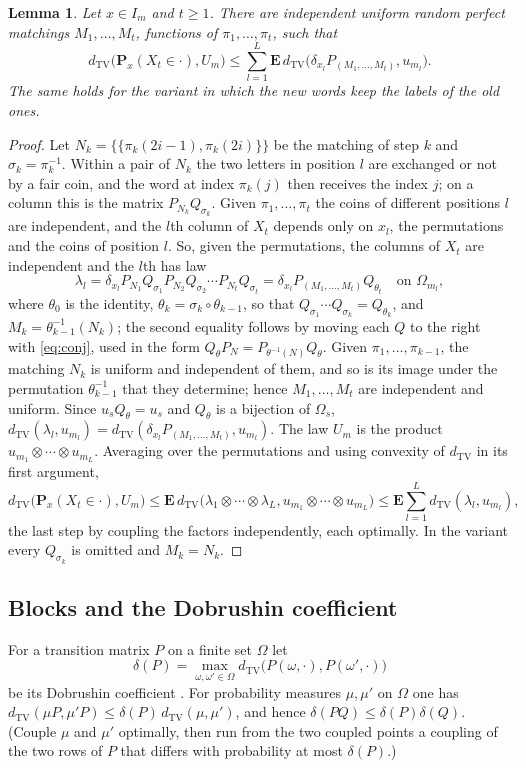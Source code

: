 \documentclass[11pt]{amsart}
\newtheorem{lemma}[theorem]{Lemma}
\theoremstyle{remark}
\numberwithin{equation}{section}
\newcommand{\TV}{d_{\mathrm{TV}}}
\newcommand{\Pm}{\mathbf P}
\newcommand{\E}{\mathbf E}
\begin{document}
\begin{lemma}\label{lem:columns}
Let $x\in I_m$ and $t\ge1$. There are independent uniform random perfect matchings $M_1,\dots,M_t$, functions of $\pi_1,\dots,\pi_t$, such that
\[
\TV\bigl(\Pm_x(X_t\in\cdot),U_m\bigr)\le\sum_{l=1}^L\E\,\TV\bigl(\delta_{x_l}P_{(M_1,\dots,M_t)},u_{m_l}\bigr).
\]
The same holds for the variant in which the new words keep the labels of the old ones.
\end{lemma}

\begin{proof}
Let $N_k=\{\{\pi_k(2i-1),\pi_k(2i)\}\}$ be the matching of step $k$ and $\sigma_k=\pi_k^{-1}$. Within a pair of $N_k$ the two letters in position $l$ are exchanged or not by a fair coin, and the word at index $\pi_k(j)$ then receives the index $j$; on a column this is the matrix $P_{N_k}Q_{\sigma_k}$. Given $\pi_1,\dots,\pi_t$ the coins of different positions $l$ are independent, and the $l$th column of $X_t$ depends only on $x_l$, the permutations and the coins of position $l$. So, given the permutations, the columns of $X_t$ are independent and the $l$th has law
\[
\lambda_l=\delta_{x_l}P_{N_1}Q_{\sigma_1}P_{N_2}Q_{\sigma_2}\cdots P_{N_t}Q_{\sigma_t}=\delta_{x_l}P_{(M_1,\dots,M_t)}Q_{\theta_t}\quad\text{on }\Omega_{m_l},
\]
where $\theta_0$ is the identity, $\theta_k=\sigma_k\circ\theta_{k-1}$, so that $Q_{\sigma_1}\cdots Q_{\sigma_k}=Q_{\theta_k}$, and $M_k=\theta_{k-1}^{-1}(N_k)$; the second equality follows by moving each $Q$ to the right with \eqref{eq:conj}, used in the form $Q_\theta P_N=P_{\theta^{-1}(N)}Q_\theta$. Given $\pi_1,\dots,\pi_{k-1}$, the matching $N_k$ is uniform and independent of them, and so is its image under the permutation $\theta_{k-1}^{-1}$ that they determine; hence $M_1,\dots,M_t$ are independent and uniform. Since $u_sQ_\theta=u_s$ and $Q_\theta$ is a bijection of $\Omega_s$, $\TV(\lambda_l,u_{m_l})=\TV(\delta_{x_l}P_{(M_1,\dots,M_t)},u_{m_l})$. The law $U_m$ is the product $u_{m_1}\otimes\cdots\otimes u_{m_L}$. Averaging over the permutations and using convexity of $\TV$ in its first argument,
\[
\TV\bigl(\Pm_x(X_t\in\cdot),U_m\bigr)\le\E\,\TV\bigl(\lambda_1\otimes\cdots\otimes\lambda_L,u_{m_1}\otimes\cdots\otimes u_{m_L}\bigr)\le\E\sum_{l=1}^L\TV(\lambda_l,u_{m_l}),
\]
the last step by coupling the factors independently, each optimally. In the variant every $Q_{\sigma_k}$ is omitted and $M_k=N_k$.
\end{proof}

\subsection{Blocks and the Dobrushin coefficient}\label{subsec:blocks}
For a transition matrix $P$ on a finite set $\Omega$ let
\[
\delta(P)=\max_{\omega,\omega'\in\Omega}\TV\bigl(P(\omega,\cdot),P(\omega',\cdot)\bigr)
\]
be its Dobrushin coefficient \cite{Do56}. For probability measures $\mu,\mu'$ on $\Omega$ one has $\TV(\mu P,\mu' P)\le\delta(P)\,\TV(\mu,\mu')$, and hence $\delta(PQ)\le\delta(P)\delta(Q)$. (Couple $\mu$ and $\mu'$ optimally, then run from the two coupled points a coupling of the two rows of $P$ that differs with probability at most $\delta(P)$.)
\end{document}
